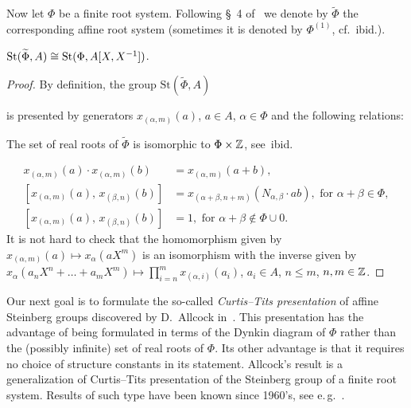 Now let $\Phi$ be a finite root system.
Following \S~4 of~\cite{A16} we denote by $\widetilde{\Phi}$ the corresponding affine root system (sometimes it is denoted by $\Phi^{(1)}$, cf.~ibid.).
\begin{lemma} \label{lem:affine-vs-loop} $\operatorname{St}(\widetilde{\Phi}, A) \cong \operatorname{St}(\Phi, A[X, X^{-1}])$.
\end{lemma}
\begin{proof}
    By definition, the group $\mathrm{St}(\widetilde{\Phi}, A)$

    is presented by generators $x_{(\alpha, m)}(a)$, $a \in A$, $\alpha \in \Phi$ and
    the following relations:

    The set of real roots of $\widetilde{\Phi}$ is isomorphic to $\Phi \times \mathbb{Z}$, see~ibid.


    \begin{align}
        x_{(\alpha, m)}(a)\cdot x_{(\alpha, m)}(b)&=x_{(\alpha, m)}(a+b),  \label{AR1}\\
        [x_{(\alpha, m)}(a),\,x_{(\beta, n)}(b)]  &=x_{(\alpha+\beta, n+m)}(N_{\alpha,\beta} \cdot ab),\text{ for }\alpha+\beta\in\Phi, \label{AR2} \\
        [x_{(\alpha, m)}(a),\,x_{(\beta, n)}(b)]  &=1,\text{ for }\alpha+\beta\not\in\Phi\cup0. \label{AR3}
    \end{align}
    It is not hard to check that the homomorphism given by $x_{(\alpha, m)}(a) \mapsto x_\alpha(aX^m)$ is an isomorphism with the inverse given by
    $x_\alpha(a_{n}X^n + \ldots + a_m X^m) \mapsto \prod_{i=n}^m x_{(\alpha, i)}(a_i)$, $a_i \in A$, $n \leq m$, $n, m\in \mathbb{Z}$.
\end{proof}

Our next goal is to formulate the so-called \textit{Curtis--Tits presentation} of affine Steinberg groups discovered by D.~Allcock in~\cite{A16, A13}.
This presentation has the advantage of being formulated in terms of the Dynkin diagram of $\Phi$ rather than the (possibly infinite) set of real roots of $\Phi$.
Its other advantage is that it requires no choice of structure constants in its statement.
Allcock's result is a generalization of Curtis--Tits presentation of the Steinberg group of a finite root system.
Results of such type have been known since 1960's, see e.\,g.~\cite[Theorem~B]{DS74}.

